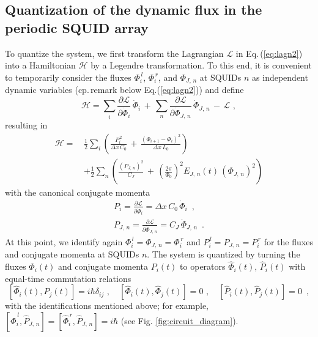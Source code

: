 \subsection{Quantization of the dynamic flux in the periodic SQUID array}
\noindent
To quantize the system, we first transform the Lagrangian $\mathcal{L}$ in Eq.\,(\ref{eq:lagn2})
into a Hamiltonian $\mathcal{H}$ by a Legendre transformation.
To this end, it is convenient to temporarily consider the fluxes $\Phi_i^{\,l}$, $\Phi_i^{\,r}$, and $\Phi_{J,\,n}$ 
at SQUIDs $n$ as independent dynamic variables (cp.\,remark below Eq.(\ref{eq:lagn2})) and define 
%
\begin{equation} \label{eq:ham1}
\mathcal{H} = \sum_{i} \frac{\partial\mathcal{L}}{\partial\dot{\Phi}_i} \, \dot{\Phi}_i 
\, + \, \sum_{n} \frac{\partial\mathcal{L}}{\partial\dot{\Phi}_{J,\,n}} \, \dot{\Phi}_{J,\,n}
\, - \, \mathcal{L} \, \, , 
\end{equation}
%
resulting in
%
\begin{equation} \label{eq:ham2}
\begin{split}
\mathcal{H} = \, & \frac{1}{2} \sum_i \left( \frac{P_i^{\,2}}{\Delta x \, C_{0}} \, + \, 
\frac{\left(\Phi_{i+1} - \Phi_{i}\right)^{2}}{\Delta x \, L_{0}} \right)  \\[2mm]
& + \frac{1}{2} \sum_n \left( \frac{\left(P_{J,\,n}\right)^2}{C_{J}} \, + \, 
 \left(\frac{2 \pi}{\Phi_0} \right)^2 E_{J,\,n}(t) \, \left( \Phi_{J,\,n} \right)^2 
\right)
\end{split}
\end{equation}
%
with the canonical conjugate momenta
%
\begin{subequations} \label{eq:mom}
\begin{eqnarray} 
P_i = \frac{\partial\mathcal{L}}{\partial\dot{\Phi}_i} = \Delta x \, C_0 \, \dot{\Phi}_i \label{eq:moma} \, \, \, , \\[2mm]
P_{J,\,n} = \frac{\partial\mathcal{L}}{\partial\dot{\Phi}_{J,\,n}} =  C_J \, \dot{\Phi}_{J,\,n} \, \, \,  . \label{eq:momb}
\end{eqnarray}
\end{subequations}
%
At this point, we identify again 
$\Phi_i^{\,l} = \Phi_{J,\,n} = \Phi_i^{\,r}$ and $P_i^{\,l} = P_{J,\,n} = P_i^{\,r}$
for the fluxes and conjugate momenta at SQUIDs $n$.
The system is quantized by turning the fluxes $\Phi_i(t)$ and conjugate momenta $P_i(t)$ 
to operators $\hat{\Phi}_i(t)$, $\hat{P}_i(t)$ with equal-time commutation relations
%
\begin{equation} \label{eq:cr} 
\left[\hat{\Phi}_i(t), \hat{P}_j(t) \right] = i \hbar \delta_{ij} \, \, , \quad 
\left[\hat{\Phi}_i(t), \hat{\Phi}_j(t) \right] = 0 \, \, , \quad 
\left[\hat{P}_i(t), \hat{P}_j(t) \right] = 0 \, \, \, , 
\end{equation}
%
with the identifications mentioned above; for example, 
$\left[\hat{\Phi}_i^{\,l}, \hat{P}_{J,\,n} \right] = 
\left[\hat{\Phi}_i^{\,r}, \hat{P}_{J,\,n} \right] = i \hbar$ (see Fig. \ref{fig:circuit_diagram}).

